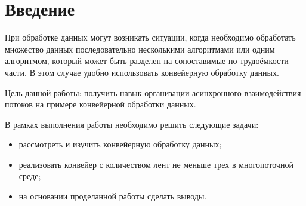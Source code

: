 \chapter*{Введение}

При обработке данных могут возникать ситуации, когда необходимо обработать множество данных последовательно несколькими алгоритмами или одним алгоритмом, который может быть разделен на сопоставимые по трудоёмкости части. В этом случае удобно использовать конвейерную обработку данных. 


Цель данной работы: получить навык организации асинхронного взаимодействия потоков на примере конвейерной обработки данных.

В рамках выполнения работы необходимо решить следующие задачи:
\begin{itemize}
	\item рассмотреть и изучить конвейерную обработку данных;
	\item реализовать конвейер с количеством лент не меньше трех в многопоточной среде;
	\item на основании проделанной работы сделать выводы.
\end{itemize}
